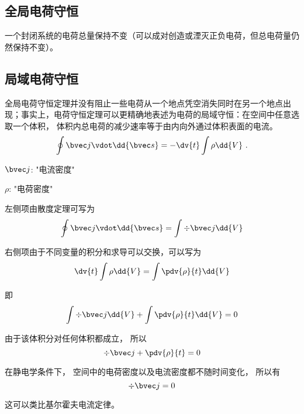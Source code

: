 
\subsection{全局电荷守恒}
一个封闭系统的电荷总量保持不变\cite{GriffE}（可以成对创造或湮灭正负电荷，但总电荷量仍然保持不变）。

\subsection{局域电荷守恒}
全局电荷守恒定理并没有阻止一些电荷从一个地点凭空消失同时在另一个地点出现；事实上，电荷守恒定理可以更精确地表述为电荷的局域守恒：在空间中任意选取一个体积， 体积内总电荷的减少速率等于由内向外通过体积表面的电流。\cite{GriffE}
\begin{equation}
\oint \bvec j \vdot \dd{\bvec s}  =  - \dv{t} \int \rho \dd{V}~.
\end{equation} 

$\bvec j$: "电流密度"

$\rho$: "电荷密度"

左侧项由散度定理可写为
\begin{equation}
\oint \bvec j \vdot \dd{\bvec s}  =\int \div \bvec j \dd{V}
\end{equation} 

右侧项由于不同变量的积分和求导可以交换，可以写为%
\begin{equation}
\dv{t} \int \rho  \dd{V}  = \int \pdv{\rho}{t} \dd{V}
\end{equation}

即
\begin{equation}
\int \div \bvec j \dd{V} + \int \pdv{\rho}{t} \dd{V} = 0
\end{equation} 

由于该体积分对任何体积都成立， 所以
\begin{equation}\label{ChgCsv_eq4}
\div \bvec j + \pdv{\rho}{t} = 0
\end{equation}

在静电学条件下， 空间中的电荷密度以及电流密度都不随时间变化， 所以有
\begin{equation}
\div \bvec j = 0
\end{equation}

这可以类比基尔霍夫电流定律。
